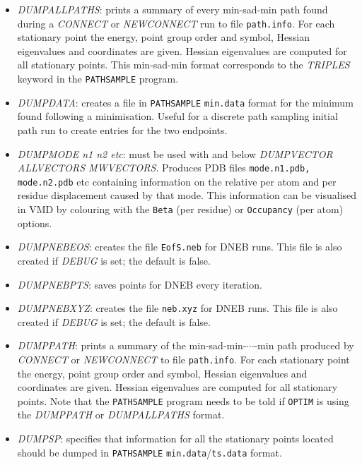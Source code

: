 \documentclass[12pt,a4paper,dvips]{article}
\begin{document}
\begin{itemize}
\item {\it DUMPALLPATHS\/}: prints a summary of every min-sad-min path 
found during a {\it CONNECT} or {\it NEWCONNECT\/} run to
file {\tt path.info}. For each stationary point the energy, point group order and symbol, 
Hessian eigenvalues and coordinates are given. Hessian eigenvalues are computed
for all stationary points. This min-sad-min format corresponds to the {\it TRIPLES\/}
keyword in the {\tt PATHSAMPLE} program.

\item {\it DUMPDATA\/}: creates a file in {\tt PATHSAMPLE} {\tt min.data} format for the minimum found
following a minimisation. Useful for a discrete path sampling initial path run to
create entries for the two endpoints.

\item {\it DUMPMODE n1 n2 etc\/}: must be used with and below {\it DUMPVECTOR ALLVECTORS MWVECTORS}. Produces PDB files {\tt mode.n1.pdb, mode.n2.pdb} etc containing information on the relative per atom and per residue displacement caused by that mode. This information can be visualised in VMD by colouring with the {\tt Beta} (per residue) or {\tt Occupancy} (per atom) options.

\item {\it DUMPNEBEOS\/}: creates the file {\tt EofS.neb} for DNEB runs. This file is
also created if {\it DEBUG\/} is set; the default is false.

\item {\it DUMPNEBPTS\/}: saves points for DNEB every iteration.

\item {\it DUMPNEBXYZ\/}: creates the file {\tt neb.xyz} for DNEB runs. This file is
also created if {\it DEBUG\/} is set; the default is false.

\item {\it DUMPPATH\/}: prints a summary of the min-sad-min-$\cdots$-min path produced by {\it CONNECT} 
or {\it NEWCONNECT\/} to
file {\tt path.info}. For each stationary point the energy, point group order and symbol, 
Hessian eigenvalues and coordinates are given. Hessian eigenvalues are computed
for all stationary points.
Note that the {\tt PATHSAMPLE} program needs to be told if {\tt OPTIM} is using
the {\it DUMPPATH\/} or {\it DUMPALLPATHS\/} format.

\item {\it DUMPSP\/}: specifies that information for all the stationary points located
should be dumped in 
{\tt PATHSAMPLE} {\tt min.data}/{\tt ts.data} format.


\end{itemize}
\end{document}
